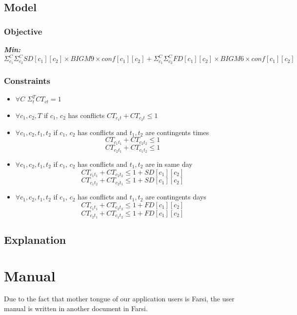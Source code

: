 \documentclass{report}
\begin{document}
\section{Model}
\subsection{Objective}

\textbf{ \textit{Min:} } $\Sigma_{c_1}^{C} \Sigma_{c_2}^{C} SD[c_1][c_2] \times BIGM9 \times conf[c_1][c_2] + \Sigma_{c_1}^{C} \Sigma_{c_2}^{C} FD[c_1][c_2] \times BIGM6 \times conf[c_1][c_2]  $  \newline 

\subsection{Constraints}

\begin{itemize}
\item{$\forall C$ \space $\Sigma_t^T CT_{ct} = 1$}

\item{$\forall c_1 , c_2 , T $ \space if $c_1$, $c_2$ has conflicts $CT_{c_1 t} + CT_{c_2 t} \le 1$ }

\item{$\forall c_1 , c_2 , t_1 , t_2$ \space if $c_1$, $c_2$ has conflicts and $t_1, t_2$ are contingents times $$CT_{c_1 t_1} + CT_{c_2 t_2} \le 1$$ $$CT_{c_2 t_1} + CT_{c_1 t_2} \le 1 $$ }

\item{$\forall c_1 , c_2 , t_1, t_2 $ \space if $c_1$, $c_2$ has conflicts and $t_1 ,t_2 $ are in same day $$CT_{c_1 t_1} + CT_{c_2 t_2} \le 1 + SD[c_1][c_2]$$ 
$$CT_{c_1 t_2} + CT_{c_2 t_1} \le 1 + SD[c_1][c_2]$$}


\item{$\forall c_1 ,  c_2 ,  t_1 , t_2$ \space if $c_1$, $c_2$ has conflicts and $t_1 , t_2$ are contingents days $$CT_{c_1 t_1} + CT_{c_2 t_2} \le 1 + FD[c_1][c_2]$$ $$CT_{c_2 t_1} + CT_{c_1 t_2} \le 1 + FD[c_1][c_2]$$  }

\end{itemize}
\section{Explanation}

\chapter{Manual}
Due to the fact that mother tongue of our application users is Farsi, the user manual is written in another document in Farsi.
\end{document}
